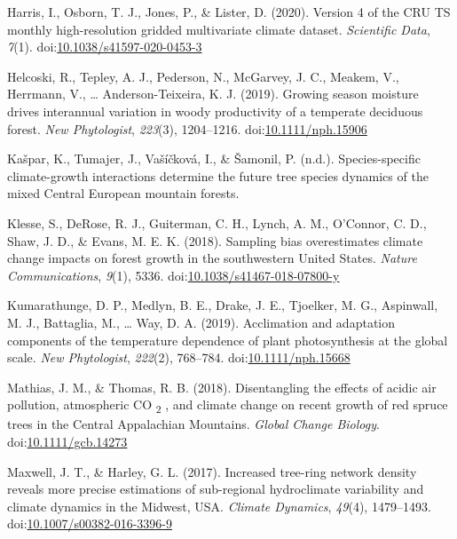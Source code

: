 \documentclass[
]{article}
\newlength{\cslhangindent}
\newenvironment{cslreferences}%
  {\setlength{\parindent}{0pt}%
  \everypar{\setlength{\hangindent}{\cslhangindent}}\ignorespaces}%
  {\par}
\begin{document}
\begin{cslreferences}
\leavevmode\hypertarget{ref-harris_version_2020}{}%
Harris, I., Osborn, T. J., Jones, P., \& Lister, D. (2020). Version 4 of
the CRU TS monthly high-resolution gridded multivariate climate dataset.
\emph{Scientific Data}, \emph{7}(1).
doi:\href{https://doi.org/10.1038/s41597-020-0453-3}{10.1038/s41597-020-0453-3}

\leavevmode\hypertarget{ref-helcoski_growing_2019}{}%
Helcoski, R., Tepley, A. J., Pederson, N., McGarvey, J. C., Meakem, V.,
Herrmann, V., \ldots{} Anderson-Teixeira, K. J. (2019). Growing season
moisture drives interannual variation in woody productivity of a
temperate deciduous forest. \emph{New Phytologist}, \emph{223}(3),
1204--1216.
doi:\href{https://doi.org/10.1111/nph.15906}{10.1111/nph.15906}

\leavevmode\hypertarget{ref-kaspar_species-specific_nodate}{}%
Kašpar, K., Tumajer, J., Vašíčková, I., \& Šamonil, P. (n.d.).
Species-specific climate-growth interactions determine the future tree
species dynamics of the mixed Central European mountain forests.

\leavevmode\hypertarget{ref-klesse_sampling_2018}{}%
Klesse, S., DeRose, R. J., Guiterman, C. H., Lynch, A. M., O'Connor, C.
D., Shaw, J. D., \& Evans, M. E. K. (2018). Sampling bias overestimates
climate change impacts on forest growth in the southwestern United
States. \emph{Nature Communications}, \emph{9}(1), 5336.
doi:\href{https://doi.org/10.1038/s41467-018-07800-y}{10.1038/s41467-018-07800-y}

\leavevmode\hypertarget{ref-kumarathunge_acclimation_2019}{}%
Kumarathunge, D. P., Medlyn, B. E., Drake, J. E., Tjoelker, M. G.,
Aspinwall, M. J., Battaglia, M., \ldots{} Way, D. A. (2019). Acclimation
and adaptation components of the temperature dependence of plant
photosynthesis at the global scale. \emph{New Phytologist},
\emph{222}(2), 768--784.
doi:\href{https://doi.org/10.1111/nph.15668}{10.1111/nph.15668}

\leavevmode\hypertarget{ref-mathias_disentangling_2018}{}%
Mathias, J. M., \& Thomas, R. B. (2018). Disentangling the effects of
acidic air pollution, atmospheric CO \textsubscript{2} , and climate
change on recent growth of red spruce trees in the Central Appalachian
Mountains. \emph{Global Change Biology}.
doi:\href{https://doi.org/10.1111/gcb.14273}{10.1111/gcb.14273}

\leavevmode\hypertarget{ref-maxwell_increased_2017}{}%
Maxwell, J. T., \& Harley, G. L. (2017). Increased tree-ring network
density reveals more precise estimations of sub-regional hydroclimate
variability and climate dynamics in the Midwest, USA. \emph{Climate
Dynamics}, \emph{49}(4), 1479--1493.
doi:\href{https://doi.org/10.1007/s00382-016-3396-9}{10.1007/s00382-016-3396-9}


\end{cslreferences}
\end{document}

